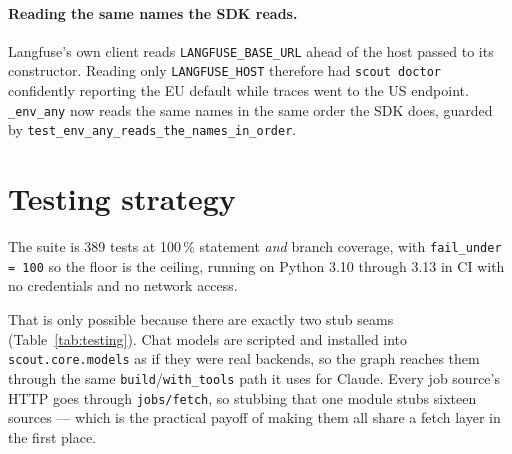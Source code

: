 \documentclass[11pt,a4paper]{article}
\begin{document}
\paragraph{Reading the same names the SDK reads.} Langfuse's own client reads
\texttt{LANGFUSE\_\allowbreak{}BASE\_\allowbreak{}URL} ahead of the host passed to its constructor. Reading only
\texttt{LANGFUSE\_\allowbreak{}HOST} therefore had \texttt{scout doctor} confidently reporting the EU
default while traces went to the US endpoint. \texttt{\_\allowbreak{}env\_\allowbreak{}any} now reads the same names in
the same order the SDK does, guarded by \texttt{test\_\allowbreak{}env\_\allowbreak{}any\_\allowbreak{}reads\_\allowbreak{}the\_\allowbreak{}names\_\allowbreak{}in\_\allowbreak{}order}.

\section{Testing strategy}

The suite is 389 tests at 100\,\% statement \emph{and} branch coverage, with
\texttt{fail\_\allowbreak{}under = 100} so the floor is the ceiling, running on Python 3.10 through 3.13
in CI with no credentials and no network access.

That is only possible because there are exactly two stub seams (Table~\ref{tab:testing}).
Chat models are scripted and installed into \texttt{scout.core.models} as if they were real
backends, so the graph reaches them through the same \texttt{build}/\texttt{with\_\allowbreak{}tools}
path it uses for Claude. Every job source's HTTP goes through \texttt{jobs/fetch}, so
stubbing that one module stubs sixteen sources --- which is the practical payoff of making
them all share a fetch layer in the first place.
\end{document}
